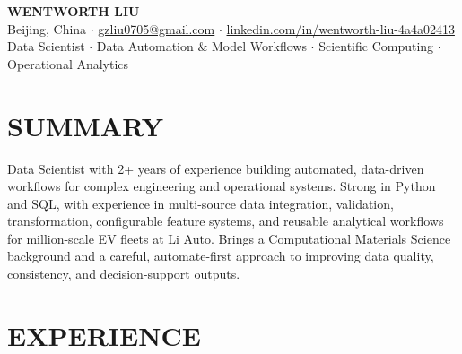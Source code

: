 \documentclass[a4paper,10pt]{article}
\begin{document}
\begin{center}
    {\Large\bfseries WENTWORTH LIU}\\[2pt]
    {\small Beijing, China \;$\cdot$\; \href{mailto:gzliu0705@gmail.com}{gzliu0705@gmail.com} \;$\cdot$\; \href{https://www.linkedin.com/in/wentworth-liu-4a4a02413/}{linkedin.com/in/wentworth-liu-4a4a02413}}\\[2pt]
    {\small Data Scientist \;$\cdot$\; Data Automation \& Model Workflows \;$\cdot$\; Scientific Computing \;$\cdot$\; Operational Analytics}
\end{center}

\vspace{-3pt}

\section{SUMMARY}
Data Scientist with 2+ years of experience building automated, data-driven workflows for complex engineering and operational systems. Strong in Python and SQL, with experience in multi-source data integration, validation, transformation, configurable feature systems, and reusable analytical workflows for million-scale EV fleets at Li Auto. Brings a Computational Materials Science background and a careful, automate-first approach to improving data quality, consistency, and decision-support outputs.

\section{EXPERIENCE}
\end{document}
